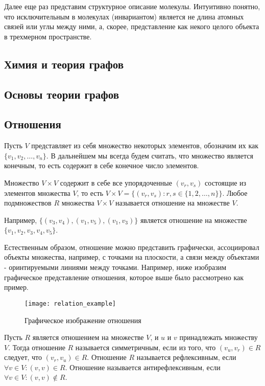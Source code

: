 \documentclass{article}
\begin{document}
Далее еще раз представим структурное описание молекулы. Интуитивно понятно, что исключительным в молекулах (инвариантом) является не длина атомных связей или углы между ними, а, скорее, представление как некого целого объекта в трехмерном пространстве. 



\newpage

\subsection{Химия и теория графов}
\subsection{Основы теории графов}
\subsection{Отношения}

Пусть $V$ представляет из себя множество некоторых элементов, обозначим их как  $\{ v_1, v_2, \dots, v_n \}$. В дальнейшем мы всегда будем считать, что множество является конечным, то есть содержит в себе конечное число элементов.

Множество $V \times V$ содержит в себе все упорядоченные $(v_r, v_s)$ состоящие из элементов множества $V$, то есть
$V \times V = \{(v_r, v_s) : r, s \in \{1, 2, \dots, n \} \}$. 
Любое подмножествов $R$ множества $V \times V$ называется отношение на множестве $V$. 

Например, $\{ (v_3, v_4), (v_1, v_5), (v_1, v_3) \}$ является отношение на множестве $\{ v_1, v_2, v_3, v_4, v_5  \}$.

Естественным образом, отношение можно представить графически, ассоциировал объекты множества, например, с точками на плоскости, а связи между объектами - оринтируемыми линиями между точками. Например, ниже изобразим графическое представление отношения, которое выше было рассмотрено как пример.

\begin{figure}[h]
\texttt{[image: relation\_example]}
\centering
\caption{Графическое изображение отношения}
\end{figure}


Пусть $R$ является отношением на множестве $V$, и $u$ и $v$ принадлежать множеству $V$. Тогда отношение $R$ называется симметричным, если из того, что $(v_u, v_r) \in R$ следует, что  $(v_r, v_u) \in R$. Отношение $R$ называется рефлексивным, если $\forall v \in V: (v, v) \in R$. Отношение называется антирефлексивным, если $\forall v \in V: (v, v) \notin R$.
\end{document}
